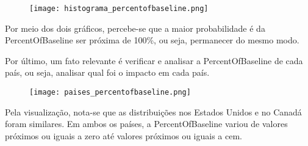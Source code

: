\documentclass{article}
\begin{document}
\begin{figure}[H] 
    \centering 
    \texttt{[image: histograma\_percentofbaseline.png]} 
\end{figure}

Por meio dos dois gráficos, percebe-se que a maior probabilidade é da PercentOfBaseline ser próxima de 100\%, ou seja, permanecer do mesmo modo.
\par Por último, um fato relevante é verificar e analisar a PercentOfBaseline de cada país, ou seja, analisar qual foi o impacto em cada país. 

\begin{figure}[H] 
    \centering 
    \texttt{[image: paises\_percentofbaseline.png]} 
\end{figure}

Pela visualização, nota-se que as distribuições nos Estados Unidos e no Canadá foram similares. Em ambos os países, a PercentOfBaseline variou de valores próximos ou iguais a zero até valores próximos ou iguais a cem.
\end{document}

